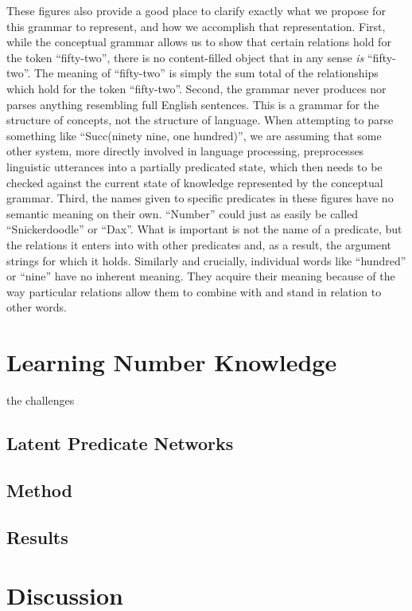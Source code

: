 \documentclass[10pt,letterpaper]{article}
\begin{document}
These figures also provide a good place to clarify exactly what we
propose for this grammar to represent, and how we accomplish that
representation. First, while the conceptual grammar allows us to show
that certain relations hold for the token ``fifty-two'', there is no
content-filled object that in any sense \emph{is} ``fifty-two''. The
meaning of ``fifty-two'' is simply the sum total of the relationships
which hold for the token ``fifty-two''. Second, the grammar never
produces nor parses anything resembling full English sentences. This
is a grammar for the structure of concepts, not the structure of
language. When attempting to parse something like ``Succ(ninety nine,
one hundred)'', we are assuming that some other system, more directly
involved in language processing, preprocesses linguistic utterances
into a partially predicated state, which then needs to be checked
against the current state of knowledge represented by the conceptual
grammar. Third, the names given to specific predicates in these
figures have no semantic meaning on their own. ``Number'' could just
as easily be called ``Snickerdoodle'' or ``Dax''. What is important is
not the name of a predicate, but the relations it enters into with
other predicates and, as a result, the argument strings for which it
holds. Similarly and crucially, individual words like ``hundred'' or
``nine'' have no inherent meaning. They acquire their meaning because
of the way particular relations allow them to combine with and stand
in relation to other words.

\section{Learning Number Knowledge}

the challenges

\subsection{Latent Predicate Networks}

\subsection{Method}

\subsection{Results}

\section{Discussion}
\end{document}
